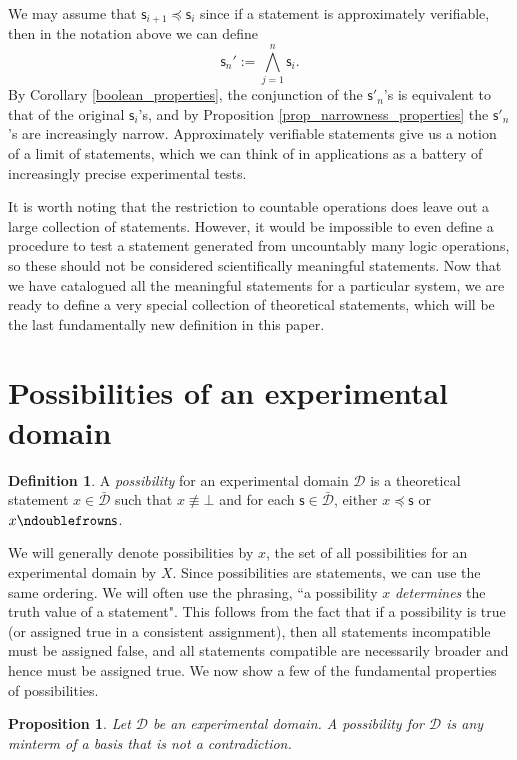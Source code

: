\documentclass[psamsfonts]{amsart}
\newtheorem{prop}[thm]{Proposition}
\theoremstyle{definition}
\newtheorem{defn}[thm]{Definition}
\theoremstyle{remark}
\numberwithin{equation}{section}
\def\contradiction{\bot}
\def\ncomp{\ndoublefrown}
\def\narrower{\preccurlyeq}
\def\bigAND{\bigwedge}
\newcommand{\stmt}[1][s] {\mathsf{#1}}
\newcommand{\edomain}[1][D] {\mathcal{#1}}
\newcommand{\tdomain}[1][D] {\bar{\mathcal{#1}}}
\begin{document}
We may assume that $\stmt_{i+1}\narrower\stmt_i$ since if a statement is approximately verifiable, then in the notation above we can define $$\stmt_n' := \bigAND\limits_{j=1}^n\stmt_i.$$ By Corollary \ref{boolean_properties}, the conjunction of the $\stmt'_n$'s is equivalent to that of the original $\stmt_i$'s, and by Proposition \ref{prop_narrowness_properties} the $\stmt'_n$'s are increasingly narrow. Approximately verifiable statements give us a notion of a limit of statements, which we can think of in applications as a battery of increasingly precise experimental tests. 

It is worth noting that the restriction to countable operations does leave out a large collection of statements. However, it would be impossible to even define a procedure to test a statement generated from uncountably many logic operations, so these should not be considered scientifically meaningful statements. Now that we have catalogued all the meaningful statements for a particular system, we are ready to define a very special collection of theoretical statements, which will be the last fundamentally new definition in this paper. 

\section{Possibilities of an experimental domain}
\label{possibilities}

\begin{defn}
A \emph{possibility} for an experimental domain $\edomain$ is a theoretical statement $x\in\tdomain$ such that $x \nequiv \contradiction$ and for each $\mathsf{s} \in \tdomain$, either $x \narrower \mathsf{s}$ or $x \ncomp \mathsf{s}$. 
\end{defn}

We will generally denote possibilities by $x$, the set of all possibilities for an experimental domain by $X$. Since possibilities are statements, we can use the same ordering. We will often use the phrasing, ``a possibility $x$ \emph{determines} the truth value of a statement". This follows from the fact that if a possibility is true (or assigned true in a consistent assignment), then all statements incompatible must be assigned false, and all statements compatible are necessarily broader and hence must be assigned true. We now show a few of the fundamental properties of possibilities. 


\begin{prop}\label{prop_poss_is_minterm}
	Let $\edomain$ be an experimental domain. A possibility for $\edomain$ is any minterm of a basis that is not a contradiction.
\end{prop}
\end{document}
